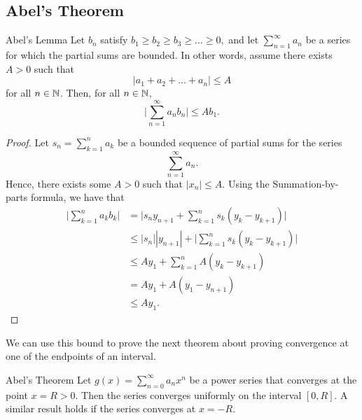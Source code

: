 \subsection{Abel's Theorem}

\begin{lemma}{Abel's Lemma}{}
    Let \( b_n  \) satisfy \( b_1 \geq b_2 \geq b_3 \geq \dots \geq 0,  \) and  let \( \sum_{ n=1 }^{ \infty  } a_n  \) be a series for which the partial sums are bounded. In other words, assume there exists \( A > 0  \) such that 
    \[  | a_1 + a_2 + \dots + a_n  |  \leq A  \] for all \( n \in \mathbb{N}  \). Then, for all \( n \in \mathbb{N}  \), 
    \[  \Big| \sum_{ n=1 }^{ \infty  } a_n b_n  \Big|  \leq Ab_1. \]
    \end{lemma}

\begin{proof}
Let \( s_n = \sum_{ k=1 }^{ n  } a_k  \) be a bounded sequence of partial sums for the series 
\[  \sum_{ n=1  }^{  \infty  } a_n.  \] Hence, there exists some \( A > 0  \) such that \( | x_n  | \leq A  \). Using the Summation-by-parts formula, we have that 
\begin{align*}
    \Big| \sum_{ k=1 }^{ n } a_k b_k  \Big| &= \Big| s_n y_{n+1} + \sum_{ k=1 }^{ n } s_k (y_k - y_{k+1}) \Big|  \\
                                            &\leq | s_n | | y_{n+1} | + \Big| \sum_{ k=1 }^{ n } s_k (y_k - y_{k+1}) \Big| \\
                                            &\leq Ay_1 + \sum_{ k=1 }^{ n } A (y_k - y_{k+1}) \\
                                            &= Ay_1 + A(y_1 - y_{n+1}) \\
                                            &\leq Ay_1.
\end{align*}
\end{proof}

We can use this bound to prove the next theorem about proving convergence at one of the endpoints of an interval.

\begin{theorem}{Abel's Theorem}{}
        Let \( g(x) = \sum_{ n=0  }^{  \infty  } a_n x^n  \) be a power series that converges at the point \( x = R > 0  \). Then the series converges uniformly on the interval \( [0,R] \). A similar result holds if the series converges at \( x = -R  \).
    \end{theorem}

